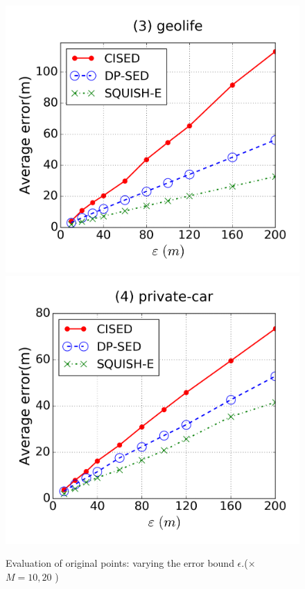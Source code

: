 \begin{figure}[tb]
\includegraphics[scale = 0.25]{figures/Exp-error-epsilon-geolife.png}
\includegraphics[scale = 0.25]{figures/Exp-error-epsilon-private.png}
\vspace{-3ex}
\caption{\small Evaluation of original points: varying the error bound $\epsilon$.(\cista  $\times$ $M = 10, {20}$ )}
\label{fig:orig-points}
\vspace{-1ex}
\end{figure}



